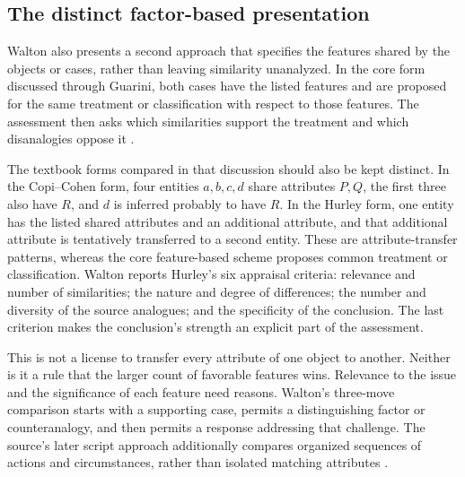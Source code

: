 \subsection{The distinct factor-based presentation}

Walton also presents a second approach that specifies the features
shared by the objects or cases, rather than leaving similarity
unanalyzed. In the core form discussed through Guarini, both cases
have the listed features and are proposed for the same treatment or
classification with respect to those features.
The assessment then asks which similarities support the treatment
and which disanalogies oppose it
\cite[author version, pp.~5--8]{Walton2014AnalogySchemes}.

The textbook forms compared in that discussion should also be kept
distinct. In the Copi--Cohen form, four entities \(a,b,c,d\) share
attributes \(P,Q\), the first three also have \(R\), and \(d\)
is inferred probably to have \(R\). In the Hurley form, one entity
has the listed shared attributes and an additional attribute, and
that additional attribute is tentatively transferred to a second entity.
These are attribute-transfer patterns, whereas the core feature-based
scheme proposes common treatment or classification.
Walton reports Hurley's six appraisal criteria: relevance and number
of similarities; the nature and degree of differences; the number
and diversity of the source analogues; and the specificity of the
conclusion. The last criterion makes the conclusion's strength an
explicit part of the assessment.

This is not a license to transfer every attribute of one object to
another. Neither is it a rule that the larger count of favorable
features wins. Relevance to the issue and the significance of each
feature need reasons. Walton's three-move comparison starts with
a supporting case, permits a distinguishing factor or counteranalogy,
and then permits a response addressing that challenge.
The source's later script approach additionally compares organized
sequences of actions and circumstances, rather than isolated matching
attributes \cite[author version, pp.~11--15]{Walton2014AnalogySchemes}.

